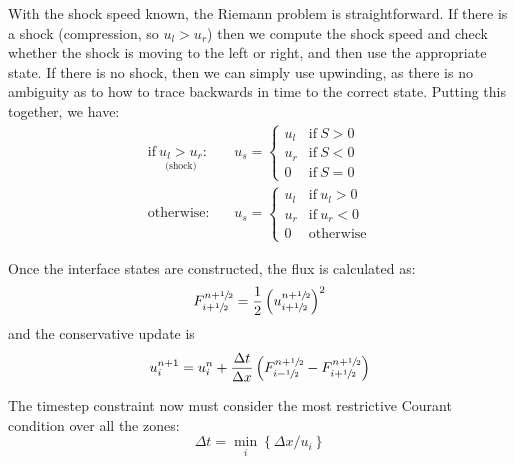 With the shock speed known, the Riemann problem is straightforward.  If there
is a shock (compression, so $u_l > u_r$) then we compute the shock speed and
check whether the shock is moving to the left or right, and then use the appropriate
state.  If there is no shock, then we can simply use upwinding, as there is no
ambiguity as to how to trace backwards in time to the correct state.
Putting this together, we have:
\begin{eqnarray}
\mathrm{if~} \underset{\text{(shock)}}{u_l > u_r}:&& u_s = \left \{ \begin{array}{cl}
                u_l & \mathrm{if~} S > 0 \\
                u_r & \mathrm{if~} S < 0 \\
                0   & \mathrm{if~} S = 0 \end{array} \right .   \\[1em]
%
\mathrm{otherwise:}&& u_s = \left \{ \begin{array}{clc}
                u_l & \mathrm{if~} u_l > 0 \\
                u_r & \mathrm{if~} u_r < 0 \\
                0   & \mathrm{otherwise} \end{array} \right .
\end{eqnarray}

Once the interface states are constructed, the flux is calculated as:
\begin{equation}
F^{n+{\sfrac{1}{2}}}_{i+{\sfrac{1}{2}}} = \frac{1}{2} \left (u_{i+{\sfrac{1}{2}}}^{n+{\sfrac{1}{2}}} \right )^2
\end{equation}
and the conservative update is
\begin{equation}
u_i^{n+1} = u_i^n + \frac{\Delta t}{\Delta x}
   \left ( F_{i-{\sfrac{1}{2}}}^{n+{\sfrac{1}{2}}} - F_{i+{\sfrac{1}{2}}}^{n+{\sfrac{1}{2}}} \right )
\end{equation}

The timestep constraint now must consider the most restrictive Courant
condition over all the zones:
\begin{equation}
\Delta t = \min_i \left \{ \Delta x / u_i \right \}
\end{equation}


